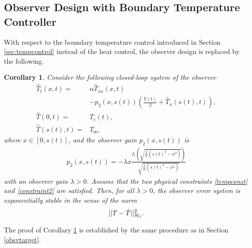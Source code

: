 \documentclass[journal]{IEEEtran}
\newtheorem{coro}{Corollary}
\begin{document}
\subsection{Observer Design with Boundary Temperature Controller}
With respect to the boundary temperature control introduced in Section \ref{sec:tempcontrol} instead of the heat control, the observer design is replaced by the following. 
\begin{coro}\label{obsvtemp}
Consider the following  closed-loop system  of the observer 
\begin{align}
 \label{observerPDEtemp}\hat{T}_t(x,t)=&\alpha \hat{T}_{xx}(x,t) \nonumber\\
 & - p_2(x,s(t))\left(\frac{\dot{Y}(t)}{\beta} + \hat{T}_x(s(t),t)\right),  \\
 \label{observerBC2temp}\hat{T}(0,t)=&T_{{\mathrm c}}(t), \\
\label{observerBC1temp}\hat{T}(s(t),t)=&T_{{\mathrm m}}, 
\end{align}
where $x\in[0,s(t)]$, and the observer gain $p_2(x,s(t))$ is 
\begin{align}\label{P2x}
p_2(x,s(t)) =  -\lambda x\frac{I_1\left(\sqrt{\frac{\lambda}{\alpha}\left(s(t)^2-x^2\right)}\right)}{\sqrt{\frac{\lambda}{\alpha} \left(s(t)^2-x^2\right)}}
\end{align}
with an observer gain $\lambda>0 $. Assume that the two physical constraints \eqref{tempconst} and \eqref{constraint2} are satisfied. Then, for all  $\lambda >0$, the observer error system is exponentially stable in the sense of the norm 
\begin{align}
||T-\hat{T}||_{{\cal H}_1}^2 . 
\end{align}
\end{coro}
The proof of Corollary \ref{obsvtemp} is established by the same procedure as in Section \ref{obsvtarget}.
\end{document}

